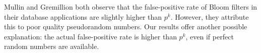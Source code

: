 \documentclass[lotsofwhite]{patmorin}
\begin{document}
Mullin \cite{m83} and Gremillion \cite{g82} both observe that the
false-positive rate of Bloom filters in their database applications
are slightly higher than $p^k$.  However, they attribute this to poor
quality pseudorandom numbers.  Our results offer another possible
explanation: the actual  false-positive rate is higher than $p^k$,
even if perfect random numbers are available.



\end{document}
